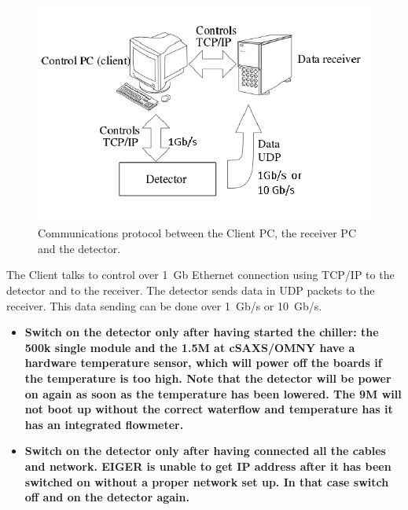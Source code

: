 \documentclass{article}
\begin{document}
\begin{figure}[t]
\begin{center}
\includegraphics[width=.8\textwidth]{Client2}
\end{center}
\caption{Communications protocol between the Client PC, the receiver PC and the detector.}
\label{fig:1}
\end{figure}

The Client talks to control over 1~Gb Ethernet connection using TCP/IP to the detector and to the receiver. The detector sends data in UDP packets to the receiver. This data sending can be done over 1~Gb/s or 10~Gb/s. 
 
\begin{itemize}
\item \textbf{Switch on the detector only after having started the chiller: the 500k single module and the 1.5M at cSAXS/OMNY have a hardware temperature sensor, which will power off the boards if the temperature is too high. Note that the detector will be power on again as soon as the temperature has been lowered. The 9M will not boot up without the correct waterflow and temperature has it has an integrated flowmeter.} 
\item \textbf{Switch on the detector only after having connected all the cables and network. EIGER is unable to get IP address after it has been switched on without a proper network set up. In that case switch off and on the detector again.}
\end{itemize}
\end{document}

